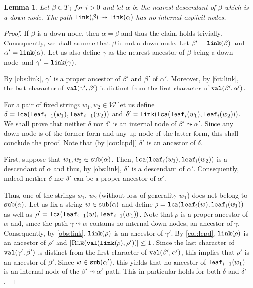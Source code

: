 \documentclass[a4paper]{article}
\newtheorem{lemma}[theorem]{Lemma}
\theoremstyle{remark}
\newcommand{\rle}{\textsc{Rle}}
\newcommand{\coll}{\mathcal{W}}
\begin{document}
\begin{lemma}\label{lem:nodown}
Let $\beta\in \overline{T}_i$ for $i>0$ and let $\alpha$ be the nearest descendant of $\beta$
which is a down-node.
The path $\mathtt{link}(\beta) \leadsto \mathtt{link}(\alpha)$ has no internal explicit nodes.
\end{lemma}
\begin{proof}
If $\beta$ is a down-node, then $\alpha=\beta$ and thus the claim holds trivially.
Consequently, we shall assume that $\beta$ is not a down-node.
Let $\beta'=\mathtt{link}(\beta)$ and $\alpha'=\mathtt{link}(\alpha)$.
Let us also define $\gamma$ as the nearest ancestor of $\beta$ being a down-node,
and $\gamma'=\mathtt{link}(\gamma)$.

By \cref{obs:link}, $\gamma'$ is a proper ancestor of $\beta'$ and $\beta'$ of $\alpha'$.
Moreover, by \cref{fct:link}, the last character of $\mathtt{val}(\gamma',\beta')$ is distinct from the first character of $\mathtt{val}(\beta',\alpha')$.

For a pair of fixed strings $w_1,w_2\in \coll$ let us define $\delta = \mathtt{lca}(\mathtt{leaf}_{i-1}(w_1),\mathtt{leaf}_{i-1}(w_2))$ and
$\delta'=\mathtt{link}(\mathtt{lca}(\mathtt{leaf}_i(w_1),\mathtt{leaf}_i(w_2)))$.
We shall prove that neither $\delta$ nor $\delta'$ is an internal node of $\beta'\leadsto \alpha'$.
Since any down-node is of the former form and any up-node of the latter form, this shall conclude the proof.
Note that (by \cref{cor:lcpd}) $\delta'$ is an ancestor of $\delta$.

First, suppose that $w_1,w_2 \in \mathtt{sub}(\alpha)$. Then, $\mathtt{lca}(\mathtt{leaf}_i(w_1),\mathtt{leaf}_i(w_2))$
is a descendant of $\alpha$ and thus, by \cref{obs:link}, $\delta'$ is a descendant of $\alpha'$.
Consequently, indeed neither $\delta$ nor $\delta'$ can be a proper ancestor of $\alpha'$.

Thus, one of the strings $w_1$, $w_2$ (without loss of generality $w_1$) does not belong to $\mathtt{sub}(\alpha)$.
Let us fix a string $w\in \mathtt{sub}(\alpha)$ and define $\rho = \mathtt{lca}(\mathtt{leaf}_i(w),\mathtt{leaf}_i(w_1))$ as well as $\rho'=\mathtt{lca}(\mathtt{leaf}_{i-1}(w),\mathtt{leaf}_{i-1}(w_1))$.
Note that $\rho$ is a proper ancestor of $\alpha$ and, since the path $\gamma\leadsto \alpha$ contains no internal down-nodes,
an ancestor of $\gamma$. Consequently, by \cref{obs:link}, $\mathtt{link}(\rho)$ is an ancestor of $\gamma'$.
By \cref{cor:lcpd}, $\mathtt{link}(\rho)$ is an ancestor of $\rho'$ and $|\rle(\tval(\tlink(\rho),\rho'))|\le 1$.
Since the last character of $\mathtt{val}(\gamma',\beta')$ is distinct from the first character of $\mathtt{val}(\beta',\alpha')$,
this implies that $\rho'$ is an ancestor of $\beta'$. Since $w\in \mathtt{sub}(\alpha')$, this yields
that no ancestor of $\mathtt{leaf}_{i-1}(w_1)$ is an internal node of the $\beta'\leadsto \alpha'$ path.
This in particular holds for both $\delta$ and $\delta'$.
\end{proof}
\end{document}
